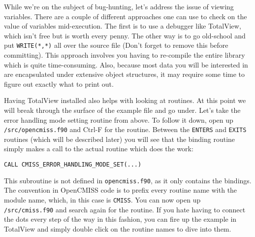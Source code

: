 While we're on the subject of bug-hunting, let's address the issue of viewing variables. There
are a couple of different approaches one can use to check on the value of variables mid-execution.
The first is to use a debugger like TotalView, which isn't free but is worth every penny. The 
other way is to go old-school and put \texttt{WRITE(*,*)} all over the source file (Don't forget 
to remove this before committing). This approach involves you having to re-compile the entire 
library which is quite time-consuming. Also, because most data you will be interested in are 
encapsulated under extensive object structures, it may require some time to figure out exactly 
what to print out.

Having TotalView installed also helps with looking at routines. At this point we will break 
through the surface of the example file and go under. Let's take the error handling mode setting
routine from above. To follow it down, open up \texttt{/src/opencmiss.f90} and Ctrl-F for the routine.
Between the \texttt{ENTERS} and \texttt{EXITS} routines (which will be described later) you will
see that the binding routine simply makes a call to the actual routine which does the work:
\begin{lstlisting}
CALL CMISS_ERROR_HANDLING_MODE_SET(...)
\end{lstlisting}
This subroutine is not defined in \texttt{opencmiss.f90}, as it only contains the bindings. The
convention in OpenCMISS code is to prefix every routine name with the module name, which, in this
case is \texttt{CMISS}. You can now open up \texttt{/src/cmiss.f90} and search again for the routine.
If you hate having to connect the dots every step of the way in this fashion, you can fire up the
example in TotalView and simply double click on the routine names to dive into them.

